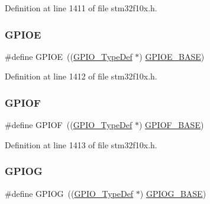 Definition at line 1411 of file stm32f10x.\+h.

\mbox{\label{group___peripheral__declaration_gae04bdb5e8acc47cab1d0532e6b0d0763}} 
\subsubsection{\texorpdfstring{G\+P\+I\+OE}{GPIOE}}
{\footnotesize\ttfamily \#define G\+P\+I\+OE~((\hyperlink{struct_g_p_i_o___type_def}{G\+P\+I\+O\+\_\+\+Type\+Def} $\ast$) \hyperlink{group___peripheral__memory__map_gab487b1983d936c4fee3e9e88b95aad9d}{G\+P\+I\+O\+E\+\_\+\+B\+A\+SE})}



Definition at line 1412 of file stm32f10x.\+h.

\mbox{\label{group___peripheral__declaration_ga43c3022dede7c9db7a58d3c3409dbc8d}} 
\subsubsection{\texorpdfstring{G\+P\+I\+OF}{GPIOF}}
{\footnotesize\ttfamily \#define G\+P\+I\+OF~((\hyperlink{struct_g_p_i_o___type_def}{G\+P\+I\+O\+\_\+\+Type\+Def} $\ast$) \hyperlink{group___peripheral__memory__map_ga7f9a3f4223a1a784af464a114978d26e}{G\+P\+I\+O\+F\+\_\+\+B\+A\+SE})}



Definition at line 1413 of file stm32f10x.\+h.

\mbox{\label{group___peripheral__declaration_ga02a2a23a32f9b02166a8c64012842414}} 
\subsubsection{\texorpdfstring{G\+P\+I\+OG}{GPIOG}}
{\footnotesize\ttfamily \#define G\+P\+I\+OG~((\hyperlink{struct_g_p_i_o___type_def}{G\+P\+I\+O\+\_\+\+Type\+Def} $\ast$) \hyperlink{group___peripheral__memory__map_ga5d8ca4020f2e8c00bde974e8e7c13cfe}{G\+P\+I\+O\+G\+\_\+\+B\+A\+SE})}



